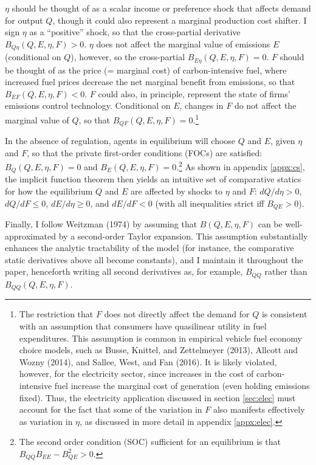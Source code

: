 \documentclass[12pt]{article}
\begin{document}
$\eta$ should be thought of as a scalar income or preference shock that affects demand for output $Q$, though it could also represent a marginal production cost shifter. I sign $\eta$ as a ``positive'' shock, so that the cross-partial derivative $B_{Q\eta}(Q,E,\eta,F)>0$. $\eta$ does not affect the marginal value of emissions $E$ (conditional on $Q$), however, so the cross-partial $B_{E\eta}(Q,E,\eta,F)=0$. $F$ should be thought of as the price (= marginal cost) of carbon-intensive fuel, where increased fuel prices decrease the net marginal benefit from emissions, so that $B_{EF}(Q,E,\eta,F)<0$. $F$ could also, in principle, represent the state of firms' emissions control technology.  Conditional on $E$, changes in $F$ do not affect the marginal value of $Q$, so that $B_{QF}(Q,E,\eta,F)=0$.\footnote{The restriction that $F$ does not directly affect the demand for $Q$ is consistent with an assumption that consumers have quasilinear utility in fuel expenditures. This assumption is common in empirical vehicle fuel economy choice models, such as Busse, Knittel, and Zettelmeyer (2013), Allcott and Wozny (2014), and Sallee, West, and Fan (2016). It is likely violated, however, for the electricity sector, since increases in the cost of carbon-intensive fuel increase the marginal cost of generation (even holding emissions fixed). Thus, the electricity application discussed in section \ref{sec:elec} must account for the fact that some of the variation in $F$ also manifests effectively as variation in $\eta$, as discussed in more detail in appendix \ref{appx:elec}.}

In the absence of regulation, agents in equilibrium will choose $Q$ and $E$, given $\eta$ and $F$, so that the private first-order conditions (FOCs) are satisfied: $B_Q(Q,E,\eta,F)=0$ and $B_E(Q,E,\eta,F)=0$.\footnote{The second order condition (SOC) sufficient for an equilibrium is that $B_{QQ}B_{EE}-B_{QE}^2>0$.} As shown in appendix \ref{appx:cs}, the implicit function theorem then yields an intuitive set of comparative statics for how the equilibrium $Q$ and $E$ are affected by shocks to $\eta$ and $F$: $dQ/d\eta>0$, $dQ/dF\leq0$, $dE/d\eta\geq0$, and $dE/dF<0$ (with all inequalities strict iff $B_{QE}>0$).

Finally, I follow Weitzman (1974) by assuming that $B(Q,E,\eta,F)$ can be well-approximated by a second-order Taylor expansion. This assumption substantially enhances the analytic tractability of the model (for instance, the comparative static derivatives above all become constants), and I maintain it throughout the paper, henceforth writing all second derivatives as, for example, $B_{QQ}$ rather than $B_{QQ}(Q,E,\eta,F)$.
\end{document}
